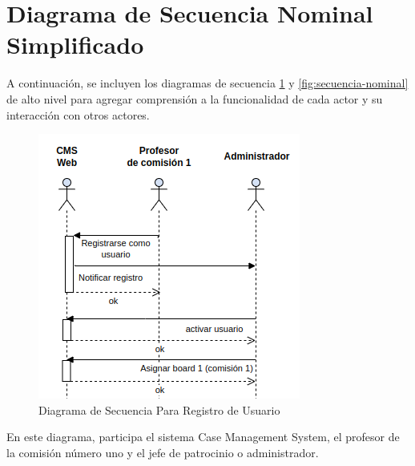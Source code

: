 \section{Diagrama de Secuencia Nominal Simplificado}
A continuación, se incluyen los diagramas de secuencia \ref{fig:secuencia-registro} y \ref{fig:secuencia-nominal} de alto nivel para agregar comprensión a la funcionalidad de cada actor y su interacción con otros actores.

\begin{figure}[H]
\centering
\includegraphics[width=0.5\linewidth]{fig/secuencia-registro.png}
\caption{Diagrama de Secuencia Para Registro de Usuario}
\label{fig:secuencia-registro}
\end{figure}
En este diagrama, participa el sistema Case Management System, el profesor de la comisión número uno y el jefe de patrocinio o administrador.

